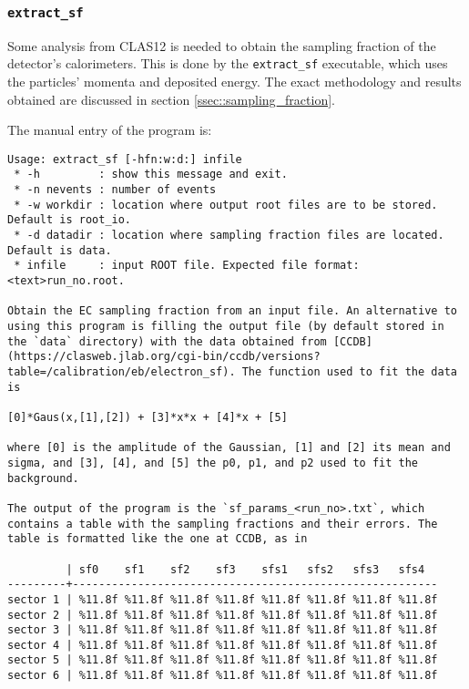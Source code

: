 \subsubsection{\texttt{extract\_sf}}
    Some analysis from CLAS12 is needed to obtain the sampling fraction of the detector's calorimeters.
    This is done by the \texttt{extract\_sf} executable, which uses the particles' momenta and deposited energy.
    The exact methodology and results obtained are discussed in section \ref{ssec::sampling_fraction}.

    The manual entry of the program is:
    \begin{lstlisting}
Usage: extract_sf [-hfn:w:d:] infile
 * -h         : show this message and exit.
 * -n nevents : number of events
 * -w workdir : location where output root files are to be stored. Default is root_io.
 * -d datadir : location where sampling fraction files are located. Default is data.
 * infile     : input ROOT file. Expected file format: <text>run_no.root.

Obtain the EC sampling fraction from an input file. An alternative to using this program is filling the output file (by default stored in the `data` directory) with the data obtained from [CCDB](https://clasweb.jlab.org/cgi-bin/ccdb/versions?table=/calibration/eb/electron_sf). The function used to fit the data is

[0]*Gaus(x,[1],[2]) + [3]*x*x + [4]*x + [5]

where [0] is the amplitude of the Gaussian, [1] and [2] its mean and sigma, and [3], [4], and [5] the p0, p1, and p2 used to fit the background.

The output of the program is the `sf_params_<run_no>.txt`, which contains a table with the sampling fractions and their errors. The table is formatted like the one at CCDB, as in

         | sf0    sf1    sf2    sf3    sfs1   sfs2   sfs3   sfs4
---------+--------------------------------------------------------
sector 1 | %11.8f %11.8f %11.8f %11.8f %11.8f %11.8f %11.8f %11.8f
sector 2 | %11.8f %11.8f %11.8f %11.8f %11.8f %11.8f %11.8f %11.8f
sector 3 | %11.8f %11.8f %11.8f %11.8f %11.8f %11.8f %11.8f %11.8f
sector 4 | %11.8f %11.8f %11.8f %11.8f %11.8f %11.8f %11.8f %11.8f
sector 5 | %11.8f %11.8f %11.8f %11.8f %11.8f %11.8f %11.8f %11.8f
sector 6 | %11.8f %11.8f %11.8f %11.8f %11.8f %11.8f %11.8f %11.8f
    \end{lstlisting}
